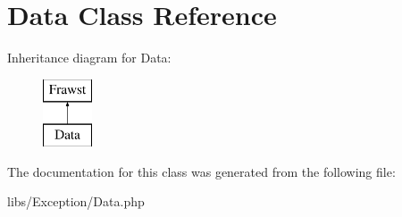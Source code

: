 \hypertarget{classData}{
\section{Data Class Reference}
\label{classData}
}
Inheritance diagram for Data:\begin{figure}[H]
\begin{center}
\leavevmode
\includegraphics[height=2.000000cm]{classData}
\end{center}
\end{figure}


The documentation for this class was generated from the following file:\begin{DoxyCompactItemize}
\item 
libs/Exception/Data.php\end{DoxyCompactItemize}

